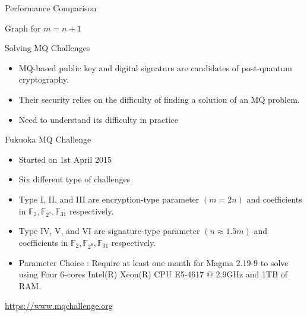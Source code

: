 \documentclass{beamer}
\newcommand{\Field}{\mathbb{F}}
\newcommand{\FField}[1]{\Field_{#1}}
\begin{document}
\begin{section}{Performance Comparison}
\begin{frame}{Graph for $m = n + 1$}
  \end{frame}
\end{section} %

\begin{section}{Solving MQ Challenges}

  \begin{frame}
    \begin{itemize}
    \item MQ-based public key and digital signature are candidates of
      post-quantum cryptography.
    \item Their security relies on the difficulty of finding a
      solution of an MQ problem.
    \item Need to understand its difficulty in practice
    \end{itemize}
  \end{frame}

  \begin{frame}{Fukuoka MQ Challenge}
    \begin{itemize}
    \item Started on 1st April 2015
    \item<1-> Six different type of challenges
    \item<2-> Type I, II, and III are encryption-type parameter
      $(m=2n)$ and coefficients in
      $\FField{2}, \FField{2^8}, \FField{31}$ respectively.
    \item<3-> Type IV, V, and VI are signature-type parameter
      $(n \approx 1.5m)$ and coefficients in
      $\FField{2}, \FField{2^8}, \FField{31}$ respectively.
    \item <4-> Parameter Choice : Require at least \alert{one month}
      for Magma 2.19-9 to solve using \alert{Four 6-cores Intel(R)
        Xeon(R) CPU E5-4617 @ 2.9GHz} and \alert{1TB of RAM}.
    \end{itemize}

    \begin{center}\url{https://www.mqchallenge.org}\end{center}
  \end{frame}


\end{section}
\end{document}

